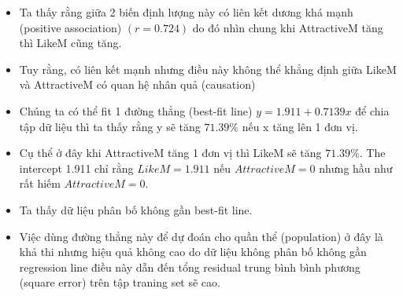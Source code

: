 \documentclass[a4paper,12pt]{article}
\begin{document}
	\begin{itemize}
		\item Ta thấy rằng giữa 2 biến định lượng này có liên kết dương khá mạnh (positive association) $(r = 0.724)$ do đó nhìn chung khi AttractiveM tăng thì LikeM cũng tăng.
		\item Tuy rằng, có liên kết mạnh nhưng điều này không thể khẳng định giữa LikeM và AttractiveM có quan hệ nhân quả (causation)
		\item Chúng ta có thể fit 1 đường thẳng (best-fit line) $y = 1.911 + 0.7139x$ để chia tập dữ liệu thì ta thấy rằng y sẽ tăng $71.39\%$ nếu x tăng lên 1 đơn vị. 
		\item Cụ thể ở đây khi AttractiveM tăng 1 đơn vị thì LikeM sẽ tăng $71.39\%$. The intercept 1.911 chỉ rằng $LikeM = 1.911$ nếu $AttractiveM = 0$ nhưng hầu như rất hiếm $AttractiveM = 0$.
		\item Ta thấy dữ liệu phân bố không gần best-fit line.
		\item[\textrightarrow] Việc dùng đường thẳng này để dự đoán cho quần thể (population) ở đây là khả thi nhưng hiệu quả không cao do dữ liệu không phân bố không gần regression line điều này dẫn đến tổng residual trung bình bình phương (square error) trên tập traning set sẽ cao.
	\end{itemize}
	
\end{document}
